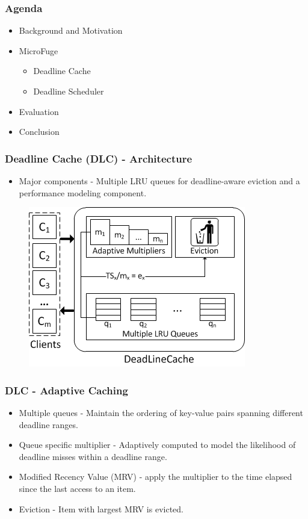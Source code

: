\documentclass{beamer}
\begin{document}
\begin{frame}
  \frametitle{Agenda}
  \begin{itemize}
  \item[\Checkmark] Background and Motivation
  \item[\Checkmark] MicroFuge
    \begin{itemize}
    \item Deadline Cache
    \item Deadline Scheduler
    \end{itemize}
  \item Evaluation
  \item Conclusion
  \end{itemize}
\end{frame}


\begin{frame}
  \frametitle{Deadline Cache (DLC) - Architecture}
  \begin{itemize}
  \item Major components - Multiple LRU queues for deadline-aware eviction and
    a performance modeling component.
  \end{itemize}
  \begin{figure}
    \begin{center}
      \centerline{\includegraphics[scale=0.8]{img/DLC_arch.png}}
    \end{center}
  \end{figure}
\end{frame}


\begin{frame}
  \frametitle{DLC - Adaptive Caching}
  \begin{itemize}
  \item Multiple queues - Maintain the ordering of key-value pairs spanning
    different deadline ranges.
  \item Queue specific multiplier - Adaptively computed to model the likelihood
    of deadline misses within a deadline range.
  \item Modified Recency Value (MRV) - apply the multiplier to the time elapsed
    since the last access to an item.
  \item Eviction - Item with largest MRV is evicted.
  \end{itemize}
\end{frame}
\end{document}
